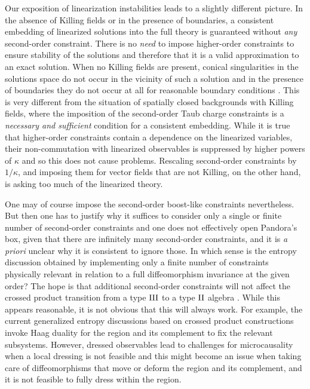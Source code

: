 \documentclass[]{jkpaper}
\theoremstyle{plain}
\theoremstyle{definition}
\begin{document}
Our exposition of linearization instabilities leads to a slightly different picture. In the absence of Killing fields or in the presence of boundaries, a consistent embedding of linearized solutions into the full theory is guaranteed without \emph{any} second-order constraint. There is no \emph{need} to impose higher-order constraints to ensure stability of the solutions and therefore that it is a valid approximation to an exact solution. When no Killing fields are present, conical singularities in the solutions space do not occur in the vicinity of such a solution and in the presence of boundaries they do not occur at all for reasonable boundary conditions \cite{fischer1980structure,Arms:1982ea,Deser:1973zzb,choquet1979maximal}. This is very different from the situation of spatially closed backgrounds with Killing fields, where the imposition of the second-order Taub charge constraints is a \emph{necessary and sufficient} condition for a consistent embedding. While it is true that higher-order constraints contain a dependence on the linearized variables, their non-commutation with linearized observables is suppressed by higher powers of $\kappa$ and so this does not cause problems. Rescaling second-order constraints by $1/\kappa$, and imposing them for vector fields that are not Killing, on the other hand, is asking too much of the linearized theory. 

One may of course impose the second-order boost-like constraints nevertheless. But then one has to justify why it suffices to consider only a single or finite number of second-order constraints and one does not effectively open Pandora's box, given that there are infinitely many second-order constraints, and it is \emph{a priori} unclear why it is consistent to ignore those. In which sense is the entropy discussion obtained by implementing only a finite number of constraints physically relevant in relation to a full diffeomorphism invariance at the given order? The hope is that additional second-order constraints will not affect the crossed product transition from a type $\rm{III}$ to a type $\rm{II}$ algebra \cite{Jensen:2023yxy}. While this appears reasonable, it is not obvious that this will always work. For example, the current generalized entropy discussions based on crossed product constructions invoke Haag duality for the region and its complement to fix the relevant subsystems. However, dressed observables lead to challenges for microcausality when a local dressing is not feasible \cite{Donnelly:2015hta,Donnelly:2016rvo,HK} and this might become an issue when taking care of diffeomorphisms that move or deform the region and its complement, and it is not feasible to fully dress within the region.
\end{document}
